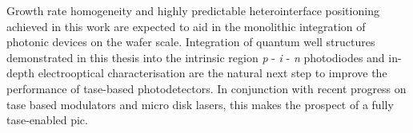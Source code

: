 Growth rate homogeneity and highly predictable heterointerface positioning achieved in this work are expected to aid in the monolithic integration of photonic devices on the wafer scale. Integration of quantum well structures demonstrated in this thesis into the intrinsic region \textit{p} - \textit{i} - \textit{n} photodiodes and in-depth electrooptical characterisation are the natural next step to improve the performance of \acs{tase}-based photodetectors. In conjunction with recent progress on \acs{tase} based modulators and micro disk lasers, this makes the prospect of a fully \acs{tase}-enabled \acs{pic}.